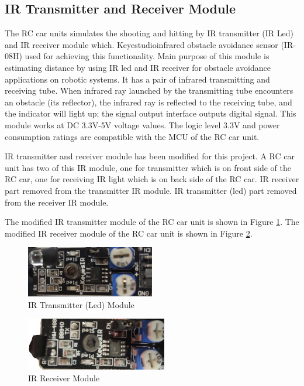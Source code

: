 \subsection{IR Transmitter and Receiver Module}
\label{sec_ir_modules}
The RC car units simulates the shooting and hitting by IR transmitter (IR Led) and IR receiver module which. Keyestudio\texttrademark\;infrared obstacle avoidance sensor (IR-08H) used for achieving this functionality. Main purpose of this module is estimating distance by using IR led and IR receiver for obstacle avoidance applications on robotic systems. It has a pair of infrared transmitting and receiving tube. When infrared ray launched by the transmitting tube encounters an obstacle (its reflector), the infrared ray is reflected to the receiving tube, and the indicator will light up; the signal output interface outputs digital signal. This module works at DC 3.3V-5V voltage values. The logic level 3.3V and power consumption ratings are compatible with the MCU of the RC car unit.

IR transmitter and receiver module has been modified for this project. A RC car unit has two of this IR module, one for transmitter which is on front side of the RC car, one for receiving IR light which is on back side of the RC car. IR receiver part removed from the transmitter IR module. IR transmitter (led) part removed from the receiver IR module.

The modified IR transmitter module of the RC car unit is shown in Figure \ref{fig:ir_transmitter}. The modified IR receiver module of the RC car unit is shown in Figure \ref{fig:ir_receiver}.

\begin{figure}[!htbp]
    \centering
    \includegraphics[width=0.50\textwidth]{Imgs/ir_transmitter.jpeg}
    \caption{\label{fig:ir_transmitter}IR Transmitter (Led) Module}
\end{figure}

\begin{figure}[!htbp]
    \centering
    \includegraphics[width=0.55\textwidth]{Imgs/ir_receiver.jpeg}
    \caption{\label{fig:ir_receiver}IR Receiver Module}
\end{figure}

